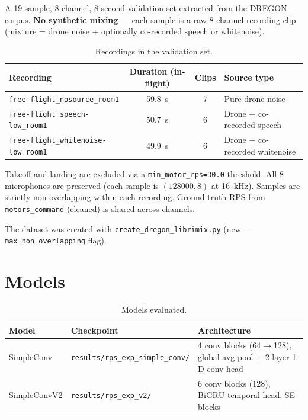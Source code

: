 \documentclass[11pt,a4paper]{article}
\newcommand{\rps}{\ensuremath{\mathrm{RPS}}}
\begin{document}
A 19-sample, 8-channel, 8-second validation set extracted from the DREGON
corpus. \textbf{No synthetic mixing} --- each sample is a raw 8-channel recording clip
(mixture = drone noise + optionally co-recorded speech or whitenoise).

\begin{table}[ht]
  \centering
  \caption{Recordings in the validation set.}
  \label{tab:dataset}
  \small
  \begin{tabular}{lccp{4.5cm}}
    \toprule
    Recording & Duration (in-flight) & Clips & Source type \\
    \midrule
    \texttt{free-flight\_nosource\_room1} & 59.8~s & 7 & Pure drone noise \\
    \texttt{free-flight\_speech-low\_room1} & 50.7~s & 6 & Drone + co-recorded speech \\
    \texttt{free-flight\_whitenoise-low\_room1} & 49.9~s & 6 & Drone + co-recorded whitenoise \\
    \bottomrule
  \end{tabular}
\end{table}

Takeoff and landing are excluded via a \texttt{min\_motor\_rps=30.0} threshold.
All 8 microphones are preserved (each sample is $(128000, 8)$ at 16~kHz).
Samples are strictly non-overlapping within each recording.
Ground-truth \rps{} from \texttt{motors\_command} (cleaned) is shared across channels.

The dataset was created with \texttt{create\_dregon\_librimix.py} (new \texttt{--max\_non\_overlapping} flag).

\section{Models}

\begin{table}[ht]
  \centering
  \caption{Models evaluated.}
  \label{tab:models}
  \small
  \begin{tabular}{llp{7cm}}
    \toprule
    Model & Checkpoint & Architecture \\
    \midrule
    SimpleConv & \texttt{results/rps\_exp\_simple\_conv/} & 4 conv blocks (64$\to$128), global avg pool + 2-layer 1-D conv head \\
    SimpleConvV2 & \texttt{results/rps\_exp\_v2/} & 6 conv blocks (128), BiGRU temporal head, SE blocks \\
    \bottomrule
  \end{tabular}
\end{table}
\end{document}
